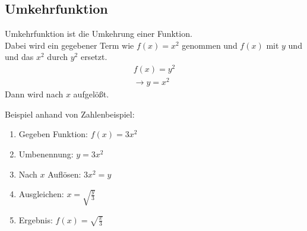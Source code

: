 \subsection{Umkehrfunktion}
Umkehrfunktion ist die Umkehrung einer Funktion. \\
Dabei wird ein gegebener Term wie $f(x) = x^2$ genommen und $f(x)$ mit $y$ und und das $x^2$ durch $y^2$ ersetzt. \\
\[
\begin{gathered}
    f(x) = y^2 \\
    \rightarrow y = x^2
\end{gathered}
\]
Dann wird nach $x$ aufgelößt.

Beispiel anhand von Zahlenbeispiel:
\begin{enumerate}
    \item Gegeben Funktion: $f(x) = 3x^2$
    \item Umbenennung: $y = 3x^2$
    \item Nach $x$ Auflösen: $3x^2 = y$
    \item Ausgleichen: $x = \sqrt{\frac{y}{3}}$
    \item Ergebnis: $f(x) = \sqrt{\frac{x}{3}}$
\end{enumerate}
